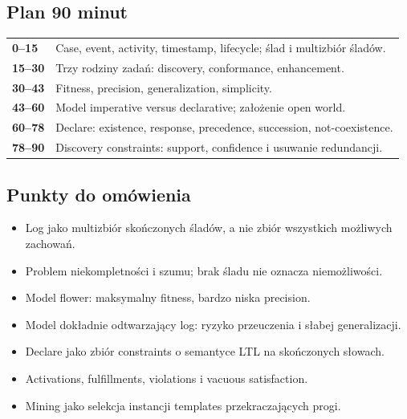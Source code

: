 \documentclass[11pt,a4paper]{article}
\begin{document}
\subsection{Plan 90 minut}
\begin{center}\small\begin{tabularx}{0.96\textwidth}{@{}>{\bfseries}p{18mm}X@{}}
0--15 & Case, event, activity, timestamp, lifecycle; ślad i multizbiór śladów.\\
15--30 & Trzy rodziny zadań: discovery, conformance, enhancement.\\
30--43 & Fitness, precision, generalization, simplicity.\\
43--60 & Model imperative versus declarative; założenie open world.\\
60--78 & Declare: existence, response, precedence, succession, not-coexistence.\\
78--90 & Discovery constraints: support, confidence i usuwanie redundancji.\\
\end{tabularx}\end{center}

\subsection{Punkty do omówienia}
\begin{itemize}
\item Log jako multizbiór skończonych śladów, a nie zbiór wszystkich możliwych zachowań.
\item Problem niekompletności i szumu; brak śladu nie oznacza niemożliwości.
\item Model flower: maksymalny fitness, bardzo niska precision.
\item Model dokładnie odtwarzający log: ryzyko przeuczenia i słabej generalizacji.
\item Declare jako zbiór constraints o semantyce LTL na skończonych słowach.
\item Activations, fulfillments, violations i vacuous satisfaction.
\item Mining jako selekcja instancji templates przekraczających progi.
\end{itemize}
\end{document}
